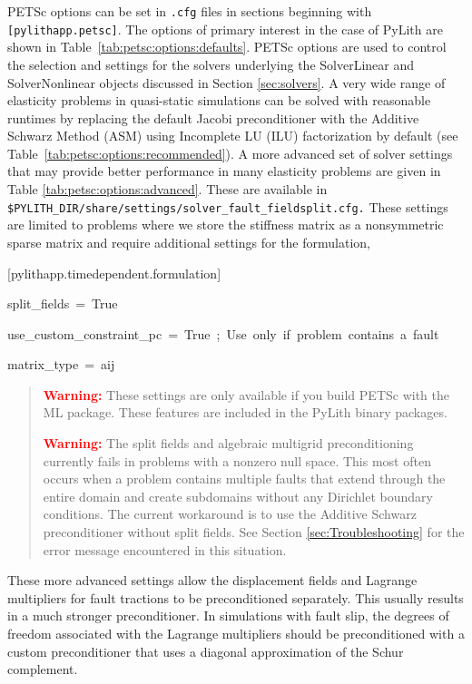 PETSc options can be set in \texttt{.cfg} files in sections beginning
with \texttt{{[}pylithapp.petsc{]}}. The options of primary interest
in the case of PyLith are shown in Table~\ref{tab:petsc:options:defaults}.
PETSc options are used to control the selection and settings for the
solvers underlying the SolverLinear and SolverNonlinear objects discussed
in Section \ref{sec:solvers}. A very wide range of elasticity problems
in quasi-static simulations can be solved with reasonable runtimes
by replacing the default Jacobi preconditioner with the Additive Schwarz
Method (ASM) using Incomplete LU (ILU) factorization by default (see
Table~\ref{tab:petsc:options:recommended}). A more advanced set
of solver settings that may provide better performance in many elasticity
problems are given in Table \ref{tab:petsc:options:advanced}. These
are available in \texttt{\$PYLITH\_DIR/share/settings/solver\_fault\_fieldsplit.cfg.}
These settings are limited to problems where we store the stiffness
matrix as a nonsymmetric sparse matrix and require additional settings
for the formulation,
\begin{lyxcode}
{[}pylithapp.timedependent.formulation{]}

split\_fields~=~True

use\_custom\_constraint\_pc~=~True~;~Use~only~if~problem~contains~a~fault

matrix\_type~=~aij\end{lyxcode}
\begin{quote}
\textbf{\textcolor{red}{Warning:}}\textbf{ }These settings are only
available if you build PETSc with the ML package. These features are
included in the PyLith binary packages.

\textbf{\textcolor{red}{Warning:}}\textbf{ }The split fields and algebraic
multigrid preconditioning currently fails in problems with a nonzero
null space. This most often occurs when a problem contains multiple
faults that extend through the entire domain and create subdomains
without any Dirichlet boundary conditions. The current workaround
is to use the Additive Schwarz preconditioner without split fields.
See Section \ref{sec:Troubleshooting} for the error message encountered
in this situation. 
\end{quote}
These more advanced settings allow the displacement fields and Lagrange
multipliers for fault tractions to be preconditioned separately. This
usually results in a much stronger preconditioner. In simulations
with fault slip, the degrees of freedom associated with the Lagrange
multipliers should be preconditioned with a custom preconditioner
that uses a diagonal approximation of the Schur complement.

